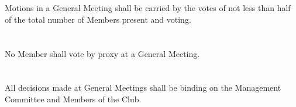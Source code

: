 \section{}
Motions in a General Meeting shall be carried by the votes of not less than half of the total number of Members present and voting.

\section{}
No Member shall vote by proxy at a General Meeting.

\section{}
All decisions made at General Meetings shall be binding on the Management Committee and Members of the Club.